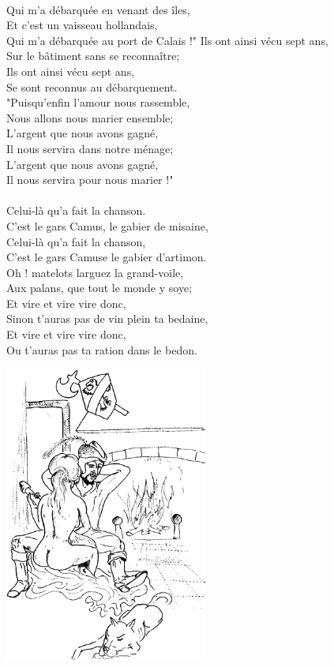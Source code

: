 \\Qui m'a débarquée en venant des îles,
\\Et c'est un vaisseau hollandais,
\\Qui m'a débarquée au port de Calais !"
\breakpage 
Ils ont ainsi vécu sept ans,
\\Sur le bâtiment sans se reconnaître;
\\Ils ont ainsi vécu sept ans,
\\Se sont reconnus au débarquement.
\\"Puisqu'enfin l'amour nous rassemble,
\\Nous allons nous marier ensemble;
\\L'argent que nous avons gagné,
\\Il nous servira dans notre ménage;
\\L'argent que nous avons gagné,
\\Il nous servira pour nous marier !"
\\\\Celui-là qu'a fait la chanson.
\\C'est le gars Camus, le gabier de misaine,
\\Celui-là qu'a fait la chanson,
\\C'est le gars Camuse le gabier d'artimon.
\\Oh ! matelots larguez la grand-voile,
\\Aux palans, que tout le monde y soye;
\\Et vire et vire vire donc,
\\Sinon t'auras pas de vin plein ta bedaine,
\\Et vire et vire vire donc,
\\Ou t'auras pas ta ration dans le bedon.
\begin{center}
\includegraphics[width=0.5\textwidth]{images/chantons.jpg}
\end{center}

\breakpage